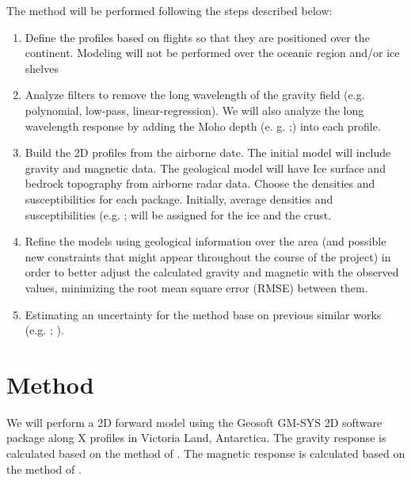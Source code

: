 \documentclass{article}
\begin{document}
	The method will be performed following the steps described below:
\begin{enumerate}
	\item Define the profiles based on flights so that they are positioned 
	over the continent. Modeling will not be performed over the oceanic 
	region and/or ice shelves
	\item Analyze filters to remove the long wavelength of the gravity field 
	(e.g. polynomial, low-pass, linear-regression). 
	We will also analyze the long wavelength response by adding the Moho depth 
	(e. g. \citet{An2015};\citet{Baranov2021}) into each profile.
	\item Build the 2D profiles from the airborne date. 
	The initial model will include gravity and magnetic data. 
	The geological model will have Ice surface and bedrock topography 
	from airborne radar data. Choose the densities and susceptibilities 
	for each package. Initially, average densities and susceptibilities 
	(e.g. \citet{Scheinert2016}; \citet{Augie2022} will be assigned 
	for the ice and the crust. 
	\item Refine the models using geological information over the area 
	(and possible new constraints that might appear throughout the course of the project) 
	in order to better adjust the calculated gravity and magnetic 
	with the observed values, minimizing the root mean square error (RMSE) between them.
	\item Estimating an uncertainty for the method base on previous similar works 
	(e.g. \citet{Tinto2015}; \citet{Constantino2020}).
\end{enumerate}

\section{Method}
We will perform a 2D forward model using the Geosoft GM-SYS 2D software package 
along X profiles in Victoria Land, Antarctica. 
The gravity response is calculated based on the method of \citet{Talwani1959}. 
The magnetic response is calculated based on the method of \citet{Heirtzler1964}.




\end{document}
